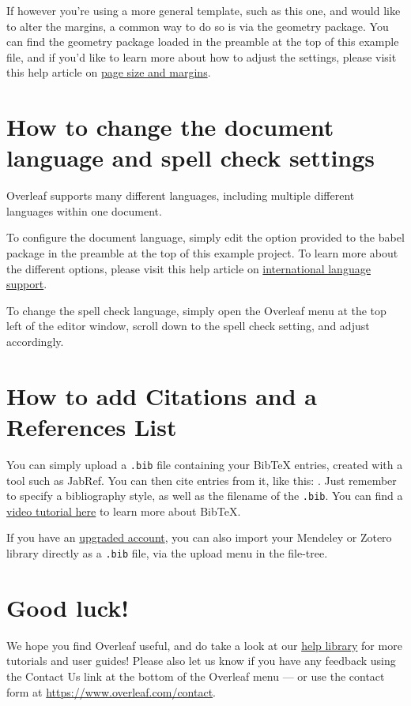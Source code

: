 \documentclass[a4paper,12pt]{scrreprt}
\begin{document}
If however you're using a more general template, such as this one, and would like to alter the margins, a common way to do so is via the geometry package. You can find the geometry package loaded in the preamble at the top of this example file, and if you'd like to learn more about how to adjust the settings, please visit this help article on \href{https://www.overleaf.com/learn/latex/page_size_and_margins}{page size and margins}.

\section{How to change the document language and spell check settings}

Overleaf supports many different languages, including multiple different languages within one document. 

To configure the document language, simply edit the option provided to the babel package in the preamble at the top of this example project. To learn more about the different options, please visit this help article on \href{https://www.overleaf.com/learn/latex/International_language_support}{international language support}.

To change the spell check language, simply open the Overleaf menu at the top left of the editor window, scroll down to the spell check setting, and adjust accordingly.

\section{How to add Citations and a References List}

You can simply upload a \verb|.bib| file containing your BibTeX entries, created with a tool such as JabRef. You can then cite entries from it, like this: \cite{greenwade93}. Just remember to specify a bibliography style, as well as the filename of the \verb|.bib|. You can find a \href{https://www.overleaf.com/help/97-how-to-include-a-bibliography-using-bibtex}{video tutorial here} to learn more about BibTeX.

If you have an \href{https://www.overleaf.com/user/subscription/plans}{upgraded account}, you can also import your Mendeley or Zotero library directly as a \verb|.bib| file, via the upload menu in the file-tree.

\section{Good luck!}

We hope you find Overleaf useful, and do take a look at our \href{https://www.overleaf.com/learn}{help library} for more tutorials and user guides! Please also let us know if you have any feedback using the Contact Us link at the bottom of the Overleaf menu --- or use the contact form at \url{https://www.overleaf.com/contact}.



\end{document}
